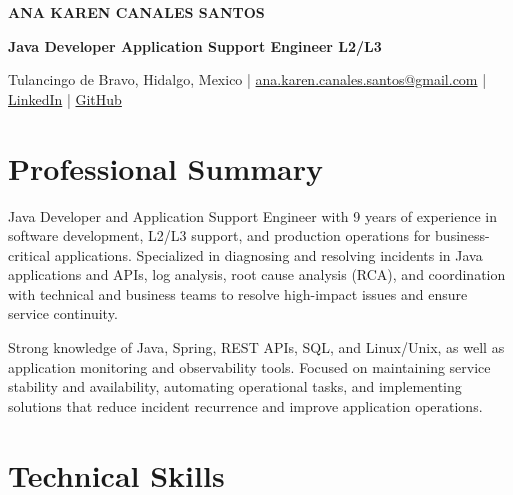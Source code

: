 \documentclass[10pt,letterpaper]{article}
\begin{document}

\begin{center}

    {\fontsize{24}{28}\selectfont
    \bfseries\color{NavyBlue}
    ANA KAREN CANALES SANTOS}

    \vspace{3pt}

    {\large
    \bfseries
    Java Developer \textbar{} Application Support Engineer
    \textbar{} L2/L3}

    \vspace{5pt}

    \small
    Tulancingo de Bravo, Hidalgo, Mexico
    \quad | \quad
    \href{mailto:ana.karen.canales.santos@gmail.com}{ana.karen.canales.santos@gmail.com}
    \quad | \quad
    \href{https://www.linkedin.com/in/anakarencanalessantos/}{LinkedIn}
    \quad | \quad
    \href{https://github.com/iHannahBeZombie}{GitHub}

\end{center}


\section{Professional Summary}

Java Developer and Application Support Engineer with 9 years of experience in software development, L2/L3 support, and production operations for business-critical applications. Specialized in diagnosing and resolving incidents in Java applications and APIs, log analysis, root cause analysis (RCA), and coordination with technical and business teams to resolve high-impact issues and ensure service continuity.

Strong knowledge of Java, Spring, REST APIs, SQL, and Linux/Unix, as well as application monitoring and observability tools. Focused on maintaining service stability and availability, automating operational tasks, and implementing solutions that reduce incident recurrence and improve application operations.


\section{Technical Skills}
\end{document}
